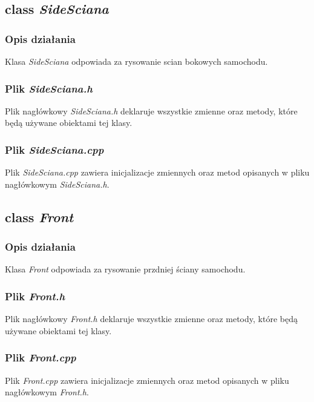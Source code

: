 \documentclass[a4paper, 12pt]{report}
\begin{document}
\subsection{class \emph{SideSciana}}
\subsubsection{Opis działania}

Klasa \emph{SideSciana} odpowiada za rysowanie scian bokowych samochodu.

\subsubsection{Plik \emph{SideSciana.h}}

Plik nagłówkowy \emph{SideSciana.h} deklaruje wszystkie zmienne oraz metody, które będą używane obiektami tej klasy.



\subsubsection{Plik \emph{SideSciana.cpp}}

Plik \emph{SideSciana.cpp} zawiera inicjalizacje zmiennych oraz metod opisanych w pliku nagłówkowym \emph{SideSciana.h}.



\subsection{class \emph{Front}}
\subsubsection{Opis działania}
Klasa \emph{Front} odpowiada za rysowanie przdniej ściany samochodu.

\subsubsection{Plik \emph{Front.h}}
Plik nagłówkowy \emph{Front.h} deklaruje wszystkie zmienne oraz metody, które będą używane obiektami tej klasy.


\subsubsection{Plik \emph{Front.cpp}}
Plik \emph{Front.cpp} zawiera inicjalizacje zmiennych oraz metod opisanych w pliku nagłówkowym \emph{Front.h}.

\end{document}
